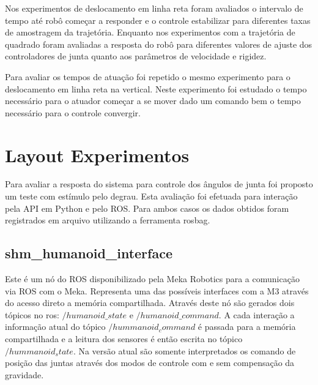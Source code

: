 Nos experimentos de deslocamento em linha reta foram avaliados o intervalo de tempo até robô começar a responder e o controle estabilizar para diferentes taxas de amostragem da trajetória. Enquanto nos experimentos com a trajetória de quadrado foram avaliadas a resposta do robô para diferentes valores de ajuste dos controladores de junta quanto aos parâmetros de velocidade e rigidez.


Para avaliar os tempos de atuação foi repetido o mesmo experimento para o deslocamento em linha reta na vertical. Neste experimento foi estudado o tempo necessário para o atuador começar a se mover dado um comando bem o tempo necessário para o controle convergir.



\section{Layout Experimentos}

Para avaliar a resposta do sistema para controle dos ângulos de junta foi proposto um teste com estímulo pelo degrau. Esta avaliação foi efetuada para interação pela API em Python e pelo ROS. Para ambos casos os dados obtidos foram registrados em arquivo utilizando a ferramenta rosbag. 




\subsection{shm\_humanoid\_interface}

Este é um nó do ROS disponibilizado pela Meka Robotics para a comunicação via ROS com o Meka. Representa uma das possíveis interfaces com a M3 através do acesso direto a memória compartilhada. Através deste nó são gerados dois tópicos no ros: $/humanoid\_state$ e $/humanoid\_command$. A cada interação a informação atual do tópico $/hummanoid_command$ é passada para a memória compartilhada e a leitura dos sensores é então escrita no tópico $/hummanoid_state$. Na versão atual são somente interpretados os comando de posição das juntas através dos modos de controle com e sem compensação da gravidade.

